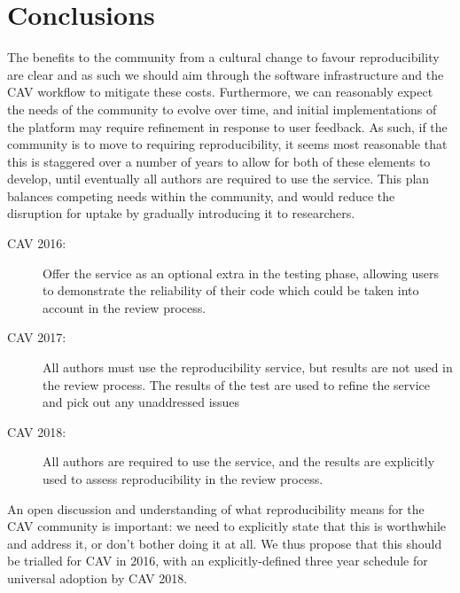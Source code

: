 \documentclass{llncs}
\begin{document}



\section{Conclusions}\label{concl}

The benefits to the community from a cultural change to favour
reproducibility are clear and as such we should aim through the
software infrastructure and the CAV workflow to mitigate these
costs. Furthermore, we can reasonably expect the needs of the
community to evolve over time, and initial implementations of the
platform may require refinement in response to user feedback. As such,
if the community is to move to requiring reproducibility, it seems
most reasonable that this is staggered over a number of years to allow
for both of these elements to develop, until eventually all authors
are required to use the service. This plan balances competing needs
within the community, and would reduce the disruption for uptake by
gradually introducing it to researchers.

\begin{description}
\item[CAV 2016:] Offer the service as an optional extra in the testing phase, allowing users to demonstrate
the reliability of their code which could be taken into account in the review process.
\item[CAV 2017:] All authors must use the reproducibility service, but results are not used in the review
process. The results of the test are used to refine the service and pick out any unaddressed issues
\item[CAV 2018:] All authors are required to use the service, and the results are explicitly used to
assess reproducibility in the review process.
\end{description}

An open discussion and understanding of what reproducibility means for
the CAV community is important: we need to explicitly state that this
is worthwhile and address it, or don't bother doing it at all. We thus
propose that this should be trialled for CAV in 2016, with an
explicitly-defined three year schedule for universal adoption by CAV
2018.



\end{document}
